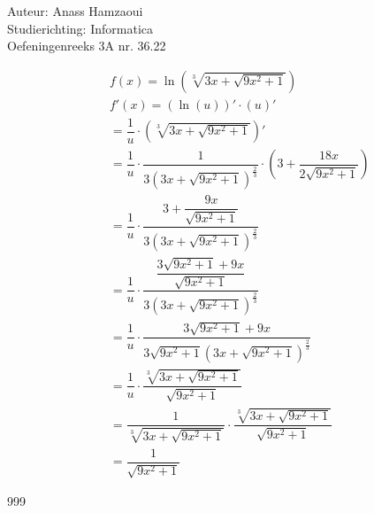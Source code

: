 \documentclass[a4paper]{article}
\begin{document}
  
\noindent \large Auteur: Anass Hamzaoui \\
\noindent \large Studierichting: Informatica \\
\noindent \large Oefeningenreeks 3A nr. 36.22 \\

\medskip

\normalsize

\begin{eqnarray*}
    && f(x) = \ln\left(\sqrt[3]{3x+\sqrt{9x^2+1}}\right) \\
    && f'(x) = (\ln(u))' \cdot (u)' \\
    && = \dfrac{1}{u} \cdot \left(\sqrt[3]{3x+\sqrt{9x^2+1}}\right)' \\
    && = \dfrac{1}{u}\cdot \dfrac{1}{3\left(3x+\sqrt{9x^2+1}\right)^{\tfrac{2}{3}}}\cdot \left(3+\dfrac{18x}{2\sqrt{9x^2+1}}\right) \\
    && = \dfrac{1}{u}\cdot \dfrac{3+\dfrac{9x}{\sqrt{9x^2+1}}}{3\left(3x+\sqrt{9x^2+1}\right)^{\tfrac{2}{3}}} \\
    && = \dfrac{1}{u}\cdot \dfrac{\dfrac{3\sqrt{9x^2+1}+9x}{\sqrt{9x^2+1}}}{3\left(3x+\sqrt{9x^2+1}\right)^{\tfrac{2}{3}}} \\
    && = \dfrac{1}{u}\cdot \dfrac{3\sqrt{9x^2+1}+9x}{3\sqrt{9x^2+1}\left(3x+\sqrt{9x^2+1}\right)^{\tfrac{2}{3}}} \\
    && = \dfrac{1}{u}\cdot \dfrac{\sqrt[3]{3x+\sqrt{9x^2+1}}}{\sqrt{9x^2+1}} \\
    && = \dfrac{1}{\sqrt[3]{3x+\sqrt{9x^2+1}}}\cdot \dfrac{\sqrt[3]{3x+\sqrt{9x^2+1}}}{\sqrt{9x^2+1}} \\
    && = \dfrac{1}{\sqrt{9x^2+1}}
\end{eqnarray*}

\begin{thebibliography}{999}
\end{thebibliography}
\end{document}
